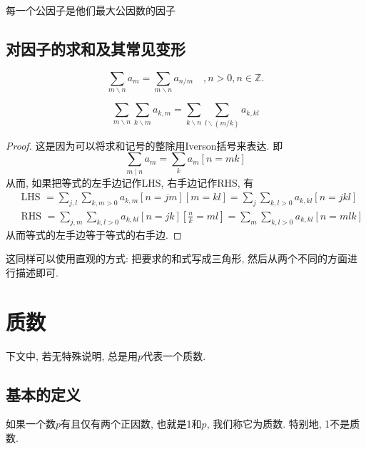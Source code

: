 \documentclass{ctexart}
\begin{document}
\begin{prop}[gcd与公因子的关系] 每一个公因子是他们最大公因数的因子
    
\end{prop}

\subsection{对因子的求和及其常见变形}

\begin{prop}[因子的对偶性]

    $$
\sum_{m \backslash n} a_m=\sum_{m \backslash n} a_{n / m} \quad, n>0, n \in \mathbb{Z} .
$$
    
\end{prop}
    
\begin{prop}[求和记号的交换]
    $$
\sum_{m \backslash n} \sum_{k \backslash m} a_{k, m}=\sum_{k \backslash n} \sum_{l \backslash(m / k)} a_{k, k l}
$$
\end{prop}

\begin{proof}
    这是因为可以将求和记号的整除用Iverson括号来表达. 即
    $$
\sum_{m \mid n} a_m=\sum_k a_m[n=m k]
$$
从而, 如果把等式的左手边记作LHS, 右手边记作RHS, 有
$$
\begin{aligned}
& \text { LHS }=\sum_{j, l} \sum_{k, m>0} a_{k, m}[n=j m][m=k l]=\sum_j \sum_{k, l>0} a_{k, k l}[n=j k l] \\
& \text { RHS }=\sum_{j, m} \sum_{k, l>0} a_{k, k l}[n=j k]\left[\frac{n}{k}=m l\right]=\sum_m \sum_{k, l>0} a_{k, k l}[n=m l k]
\end{aligned}
$$
从而等式的左手边等于等式的右手边. 
\end{proof}

这同样可以使用直观的方式: 把要求的和式写成三角形, 然后从两个不同的方面进行描述即可. 

\section{质数}

下文中, 若无特殊说明, 总是用$p$代表一个质数. 

\subsection{基本的定义}

\begin{definition}[质数] 如果一个数$p$有且仅有两个正因数, 也就是1和$p$, 我们称它为质数. 
    特别地, 1不是质数. 
\end{definition}
\end{document}
